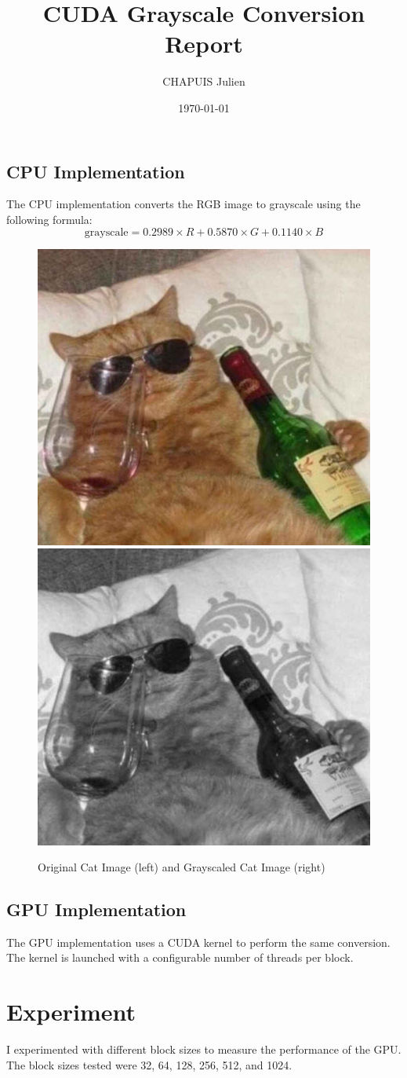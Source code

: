\documentclass{article}
\title{CUDA Grayscale Conversion Report}
\author{CHAPUIS Julien}
\date{\today}
\begin{document}
\maketitle

\subsection{CPU Implementation}
The CPU implementation converts the RGB image to grayscale using the following formula:
\[
\text{grayscale} = 0.2989 \times R + 0.5870 \times G + 0.1140 \times B
\]

\begin{figure}[h]
    \centering
    \includegraphics[width=0.45\linewidth]{drunkCat.jpg}
    \includegraphics[width=0.45\linewidth]{grayscaled_drunkCat.jpg}
    \caption{Original Cat Image (left) and Grayscaled Cat Image (right)}
    \label{fig:cat_images}
\end{figure}

\subsection{GPU Implementation}
The GPU implementation uses a CUDA kernel to perform the same conversion. The kernel is launched with a configurable number of threads per block.

\section{Experiment}
I experimented with different block sizes to measure the performance of the GPU. The block sizes tested were 32, 64, 128, 256, 512, and 1024.
\end{document}
